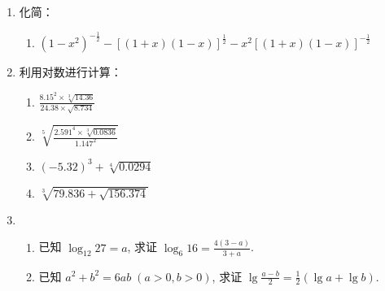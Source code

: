 \begin{enumerate}
  \item 化简：
 \begin{enumerate}
     \item $(1-x^2)^{-\tfrac{1}{2}}-[(1+x)(1-x)]^{\tfrac{1}{2}}-x^2 [(1+x)(1-x)]^{-\tfrac{1}{2}}$
 \end{enumerate} 

 \item 利用对数进行计算：
 \begin{multicols}{2}
\begin{enumerate}
 \item $\frac{8.15^{2} \times \sqrt[3]{14.36}}{24.38 \times \sqrt{8.734}}$
 \item $\sqrt[5]{\frac{2.591^{4} \times \sqrt[3]{0.0836}}{1.147^{2}}}$
 \item $(-5.32)^{3}+\sqrt[4]{0.0294}$
 \item $\sqrt[3]{79.836+\sqrt{156.374}}$
\end{enumerate}
 \end{multicols}

\item \begin{enumerate}
    \item 已知 $\log _{12} 27=a$, 求证 $\log _{6} 16=\frac{4(3-a)}{3+a}$.
    \item 已知 $a^{2}+b^{2}=6 a b\; (a>0, b>0)$,
 求证 $\lg \frac{a-b}{2}=\frac{1}{2}(\lg a+\lg b)$.
\end{enumerate}


\end{enumerate}
